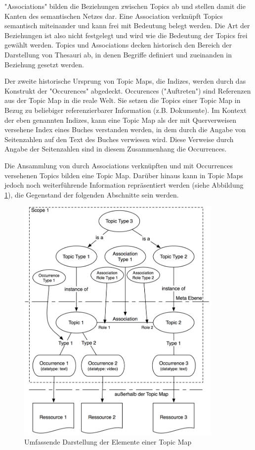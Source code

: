 "Associations" bilden die Beziehungen zwischen Topics ab und stellen damit die Kanten des semantischen Netzes dar. Eine Association verknüpft Topics semantisch miteinander und kann frei mit Bedeutung belegt werden. Die Art der Beziehungen ist also nicht festgelegt und wird wie die Bedeutung der Topics frei gewählt werden. Topics und Associations decken historisch den Bereich der Darstellung von Thesauri ab, in denen Begriffe definiert und zueinanden in Beziehung gesetzt werden. 

Der zweite historische Ursprung von Topic Maps, die Indizes, werden durch das Konstrukt der "Occurences" abgedeckt. Occurences ("Auftreten") sind Referenzen aus der Topic Map in die reale Welt. Sie setzen die Topics einer Topic Map in Bezug zu beliebiger referenzierbarer Information (z.B. Dokumente). Im Kontext der eben genannten Indizes, kann eine Topic Map als der mit Querverweisen versehene Index eines Buches verstanden werden, in dem durch die Angabe von Seitenzahlen auf den Text des Buches verwiesen wird. Diese Verweise durch Angabe der Seitenzahlen sind in diesem Zusammenhang die Occurrences.

Die Ansammlung von durch Associations verknüpften und mit Occurrences versehenen Topics bilden eine Topic Map. Darüber hinaus kann in Topic Maps jedoch noch weiterführende Information repräsentiert werden (siehe Abbildung \ref{fig:img_Persistenz_TMFull}), die Gegenstand der folgenden Abschnitte sein werden.

\begin{figure}[htbp]
	\centering
		\includegraphics[width=10cm]{img/Persistenz/TMFull.png}
	\caption{Umfassende Darstellung der Elemente einer Topic Map}
	\label{fig:img_Persistenz_TMFull}
\end{figure}

